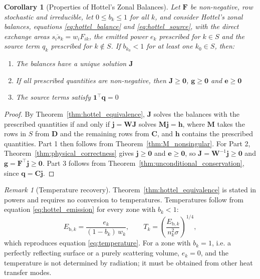 \documentclass[preprint,1p,times]{elsarticle}
\theoremstyle{plain}
\newtheorem{corollary}[theorem]{Corollary}
\theoremstyle{definition}
\theoremstyle{remark}
\newtheorem{remark}[theorem]{Remark}
\begin{document}
\begin{corollary}[Properties of Hottel's Zonal Balances]
\label{cor:hottel_properties}
Let $\mathbf{F}$ be non-negative, row stochastic and irreducible, let $0 \leq b_k \leq 1$ for all $k$, and consider Hottel's zonal balances, equations \eqref{eq:hottel_balance} and \eqref{eq:hottel_source}, with the direct exchange areas $\overline{s_i s_k} = w_i F_{ik}$, the emitted power $e_k$ prescribed for $k \in S$ and the source term $q_k$ prescribed for $k \notin S$. If $b_{k_0} < 1$ for at least one $k_0 \in S$, then:
\begin{enumerate}
\item The balances have a unique solution $\mathbf{J}$
\item If all prescribed quantities are non-negative, then $\mathbf{J} \geq \mathbf{0}$, $\mathbf{g} \geq \mathbf{0}$ and $\mathbf{e} \geq \mathbf{0}$
\item The source terms satisfy $\mathbf{1}^\top \mathbf{q} = 0$
\end{enumerate}
\end{corollary}

\begin{proof}
By Theorem~\ref{thm:hottel_equivalence}, $\mathbf{J}$ solves the balances with the prescribed quantities if and only if $\mathbf{j} = \mathbf{W}\mathbf{J}$ solves $\mathbf{M}\mathbf{j} = \mathbf{h}$, where $\mathbf{M}$ takes the rows in $S$ from $\mathbf{D}$ and the remaining rows from $\mathbf{C}$, and $\mathbf{h}$ contains the prescribed quantities. Part 1 then follows from Theorem~\ref{thm:M_nonsingular}. For Part 2, Theorem~\ref{thm:physical_correctness} gives $\mathbf{j} \geq \mathbf{0}$ and $\mathbf{e} \geq \mathbf{0}$, so $\mathbf{J} = \mathbf{W}^{-1}\mathbf{j} \geq \mathbf{0}$ and $\mathbf{g} = \mathbf{F}^\top\mathbf{j} \geq \mathbf{0}$. Part 3 follows from Theorem~\ref{thm:unconditional_conservation}, since $\mathbf{q} = \mathbf{C}\mathbf{j}$.
\end{proof}

\begin{remark}[Temperature recovery]
\label{rem:temperature_recovery}
Theorem~\ref{thm:hottel_equivalence} is stated in powers and requires no conversion to temperatures. Temperatures follow from equation \eqref{eq:hottel_emission} for every zone with $b_k < 1$:
\begin{equation*}
E_{\mathrm{b},k} = \frac{e_k}{(1-b_k)\, w_k} ,
\qquad
T_k = \left( \frac{E_{\mathrm{b},k}}{n_k^2 \sigma} \right)^{1/4} ,
\end{equation*}
which reproduces equation \eqref{eq:temperature}. For a zone with $b_k = 1$, i.e. a perfectly reflecting surface or a purely scattering volume, $e_k = 0$, and the temperature is not determined by radiation; it must be obtained from other heat transfer modes.
\end{remark}
\end{document}
